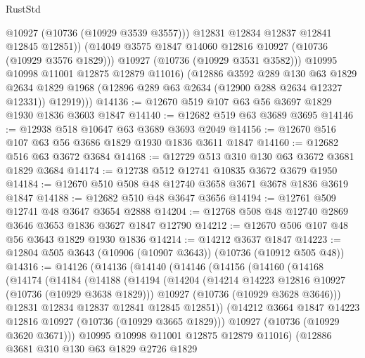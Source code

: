 \begin{lexlean}{RustStd}
\begin{coremodule}
                  @10927
                  (@10736 (@10929 @3539 @3557)))
                @12831
                @12834
                @12837
                @12841
                @12845
                @12851))
            (@14049 @3575 @1847 @14060 @12816 @10927 (@10736 (@10929 @3576 @1829)))
            @10927
            (@10736 (@10929 @3531 @3582)))
          @10995
          @10998
          @11001
          @12875
          @12879
          @11016)
        (@12886
          @3592
          @289
          @130
          @63
          @1829
          @2634
          @1829
          @1968
          (@12896 @289 @63 @2634 (@12900 @288 @2634 @12327 @12331))
          @12919)))
@14136 := @12670 @519 @107 @63 @56 @3697 @1829 @1930 @1836 @3603 @1847
@14140 := @12682 @519 @63 @3689 @3695
@14146 := @12938 @518 @10647 @63 @3689 @3693 @2049
@14156 := @12670 @516 @107 @63 @56 @3686 @1829 @1930 @1836 @3611 @1847
@14160 := @12682 @516 @63 @3672 @3684
@14168 := @12729 @513 @310 @130 @63 @3672 @3681 @1829 @3684
@14174 := @12738 @512 @12741 @10835 @3672 @3679 @1950
@14184 := @12670 @510 @508 @48 @12740 @3658 @3671 @3678 @1836 @3619 @1847
@14188 := @12682 @510 @48 @3647 @3656
@14194 := @12761 @509 @12741 @48 @3647 @3654 @2888
@14204 := @12768 @508 @48 @12740 @2869 @3646 @3653 @1836 @3627 @1847 @12790
@14212 := @12670 @506 @107 @48 @56 @3643 @1829 @1930 @1836
@14214 := @14212 @3637 @1847
@14223 := @12804 @505 @3643 (@10906 (@10907 @3643)) (@10736 (@10912 @505 @48))
@14316 := @14126
    (@14136
      (@14140
        (@14146
          (@14156
            (@14160
              (@14168
                (@14174
                  (@14184
                    (@14188
                      (@14194
                        (@14204
                          (@14214 @14223 @12816 @10927 (@10736 (@10929 @3638 @1829)))
                          @10927
                          (@10736 (@10929 @3628 @3646)))
                        @12831
                        @12834
                        @12837
                        @12841
                        @12845
                        @12851))
                    (@14212 @3664 @1847 @14223 @12816 @10927 (@10736 (@10929 @3665 @1829)))
                    @10927
                    (@10736 (@10929 @3620 @3671)))
                  @10995
                  @10998
                  @11001
                  @12875
                  @12879
                  @11016)
                (@12886
                  @3681
                  @310
                  @130
                  @63
                  @1829
                  @2726
                  @1829

\end{coremodule}
\end{lexlean}
